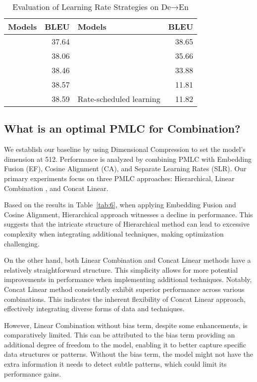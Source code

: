 \documentclass[conference]{IEEEtran}
\begin{document}
\begin{table}[!tb]
    \centering
    \caption{Evaluation of Learning Rate Strategies on De→En}
    \label{tab:5}
    \begin{tabular}{|l|r|l|r|}
        \hline
        \textbf{Models} & \textbf{BLEU} & \textbf{Models} & \textbf{BLEU} \\
        \hline
                       & 37.64 &                        & 38.65 \\
                 & 38.06 &                        & 35.66 \\
                 & 38.46 &                         & 33.88 \\
                  & 38.57 &                           & 11.81 \\
                  & 38.59 & Rate-scheduled learning                 & 11.82 \\
        \hline
    \end{tabular}
\end{table}


\subsection{What is an optimal PMLC for Combination?}
We establish our baseline by using Dimensional Compression to set the model's dimension at 512. Performance is analyzed by combining PMLC with Embedding Fusion (EF), Cosine Alignment (CA), and Separate Learning Rates (SLR). Our primary experiments focus on three PMLC approaches: Hierarchical, Linear Combination \cite{dou2018exploiting}, and Concat Linear.

Based on the results in Table~\ref{tab:6}, when applying Embedding Fusion and Cosine Alignment, Hierarchical approach witnesses a decline in performance. This suggests that the intricate structure of Hierarchical method can lead to excessive complexity when integrating additional techniques, making optimization challenging.

On the other hand, both Linear Combination and Concat Linear methods have a relatively straightforward structure. This simplicity allows for more potential improvements in performance when implementing additional techniques. Notably, Concat Linear method consistently exhibit superior performance across various combinations. This indicates the inherent flexibility of Concat Linear approach, effectively integrating diverse forms of data and techniques.

However, Linear Combination without bias term, despite some enhancements, is comparatively limited. This can be attributed to the bias term providing an additional degree of freedom to the model, enabling it to better capture specific data structures or patterns. Without the bias term, the model might not have the extra information it needs to detect subtle patterns, which could limit its performance gains.
\end{document}
